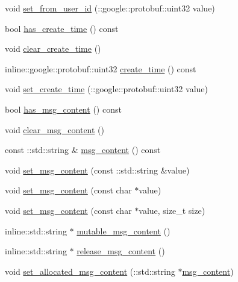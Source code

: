 \begin{DoxyCompactItemize}
\item 
void \hyperlink{class_i_m_1_1_base_define_1_1_server_group_msg_a66f9290d21c15c1fe11d5559541f9fad}{set\+\_\+from\+\_\+user\+\_\+id} (\+::google\+::protobuf\+::uint32 value)
\item 
bool \hyperlink{class_i_m_1_1_base_define_1_1_server_group_msg_a328a84413500619585db038af7e023a0}{has\+\_\+create\+\_\+time} () const 
\item 
void \hyperlink{class_i_m_1_1_base_define_1_1_server_group_msg_a98d43711da37197dee35056c03a213e0}{clear\+\_\+create\+\_\+time} ()
\item 
inline\+::google\+::protobuf\+::uint32 \hyperlink{class_i_m_1_1_base_define_1_1_server_group_msg_af0e5863bd93f451390566f8598554d51}{create\+\_\+time} () const 
\item 
void \hyperlink{class_i_m_1_1_base_define_1_1_server_group_msg_a273639a97c72fd855a6149a5e54eae75}{set\+\_\+create\+\_\+time} (\+::google\+::protobuf\+::uint32 value)
\item 
bool \hyperlink{class_i_m_1_1_base_define_1_1_server_group_msg_aadf79cffa7b51b8f5821a3dfe037ef17}{has\+\_\+msg\+\_\+content} () const 
\item 
void \hyperlink{class_i_m_1_1_base_define_1_1_server_group_msg_a96206b51a66205988fc406a8f02e46f1}{clear\+\_\+msg\+\_\+content} ()
\item 
const \+::std\+::string \& \hyperlink{class_i_m_1_1_base_define_1_1_server_group_msg_a23744f127f2a31dfb69b9f307e8ab7f2}{msg\+\_\+content} () const 
\item 
void \hyperlink{class_i_m_1_1_base_define_1_1_server_group_msg_a13e9a7beb135941052472beddc77197f}{set\+\_\+msg\+\_\+content} (const \+::std\+::string \&value)
\item 
void \hyperlink{class_i_m_1_1_base_define_1_1_server_group_msg_a13d434a72d52ef0dae2c2f53215dc08b}{set\+\_\+msg\+\_\+content} (const char $\ast$value)
\item 
void \hyperlink{class_i_m_1_1_base_define_1_1_server_group_msg_a107e39fa1ba5108c44e8ce5dc5e5f29f}{set\+\_\+msg\+\_\+content} (const char $\ast$value, size\+\_\+t size)
\item 
inline\+::std\+::string $\ast$ \hyperlink{class_i_m_1_1_base_define_1_1_server_group_msg_a3d87ef600cfa6b53d5947f420bbf55c6}{mutable\+\_\+msg\+\_\+content} ()
\item 
inline\+::std\+::string $\ast$ \hyperlink{class_i_m_1_1_base_define_1_1_server_group_msg_ae77b997bdb50e7e61e9e9c4e4cdd1309}{release\+\_\+msg\+\_\+content} ()
\item 
void \hyperlink{class_i_m_1_1_base_define_1_1_server_group_msg_a3da2738313bdaba1dd9e909fd6168474}{set\+\_\+allocated\+\_\+msg\+\_\+content} (\+::std\+::string $\ast$\hyperlink{class_i_m_1_1_base_define_1_1_server_group_msg_a23744f127f2a31dfb69b9f307e8ab7f2}{msg\+\_\+content})
\end{DoxyCompactItemize}
